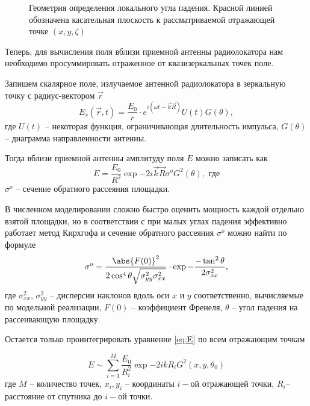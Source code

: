 \begin{figure}[h!]
    \centering
    \def\svgwidth{0.75\linewidth}
    
    \caption{Геометрия определения локального угла падения. Красной линией
    обозначена касательная плоскость к рассматриваемой отражающей точке
$(x,y,\zeta)$}
    \label{fig:local_theta}
\end{figure}


Теперь, для вычисления поля вблизи приемной антенны радиолокатора нам
необходимо просуммировать отраженное от квазизеркальных точек поле.


Запишем скалярное поле, излучаемое антенной радиолокатора в зеркальную точку с радиус-вектором $\vec
r$
\begin{equation}
    E_{s}(\vec r,t) = \frac{E_0}{r}  \cdot  e^{i(\omega t - \vec k \vec
    R)} U(t)G(\theta), 
\end{equation}
где $U(t)$ -- некоторая функция, ограничивающая длительность импульса,
$G(\theta)$ -- диаграмма направленности антенны.



Тогда вблизи приемной антенны амплитуду поля $E$ можно записать как
\begin{equation}
    \label{eq:E}
    E =  \frac{E_0}{R^2} \exp{-2i\vec k\vec R} \sigma^o 
    G^2(\theta)
    , \text{ где}
\end{equation}
$\sigma^o$ -- сечение обратного рассеяния площадки.

В численном моделировании сложно быстро оценить мощность каждой отдельно взятой
площадки, но в соответствии с \cite{bass-and-fuks} при малых углах падения
эффективно работает метод Кирхгофа и сечение обратного рассеяния $\sigma^o$
можно найти по формуле
 \begin{equation}
     \label{eq:frenel}
     \sigma^o = \frac{\abs{F(0)}^2}{2\cos^4\theta \sqrt{\sigma^2_{yy}\sigma^2_{xx}}}
     \cdot \exp{-\frac{-\tan^2 \theta}{2 \sigma^2_{xx}}},
 \end{equation}
 где $\sigma_{xx}^2$, $\sigma_{yy}^2$ -- дисперсии наклонов вдоль оси $x$ и $y$
 соответственно, вычисляемые по модельной реализации, $F(0)$ -- коэффициент
 Френеля,  $\theta$ -- угол падения на рассеивающую площадку. 


Остается только проинтегрировать уравнение \eqref{eq:E} по всем отражающим
точкам 

\begin{equation}
    E \sim \sum\limits_{i=1}^{M} \frac{E_0}{R_i^2} \exp{-2ikR_i}
    G^2(x,y,\theta_0)
\end{equation}
где $M$ -- количество точек,  $x_i,y_i$ -- координаты  $i-$ой отражающей точки,
 $R_i$-- расстояние от спутника до  $i-$ой точки.


